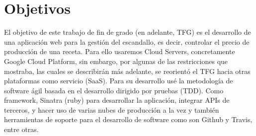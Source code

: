 

%

\section{Objetivos}\label{cap.1.1}
El objetivo de este trabajo de fin de grado (en adelante, TFG) es el desarrollo de una aplicación web para la gestión del escandallo, es decir, controlar el precio de producción de una receta. Para ello usaremos Cloud Servers, concretamente Google Cloud Platform, sin embargo, por algunas de las restricciones que mostraba, las cuales se describirán más adelante, se reorientó el TFG hacia otras plataformas como servicio (SaaS). Para su desarrollo usé la metodología de software ágil basada en el desarrollo dirigido por pruebas (TDD). Como framework, Sinatra (ruby) para desarrollar la aplicación, integrar APIs de terceros, y hacer uso de varias nubes de producción a la vez y también herramientas de soporte para el desarrollo de software como son Github y Travis, entre otras.

\vspace*{0.2in}
